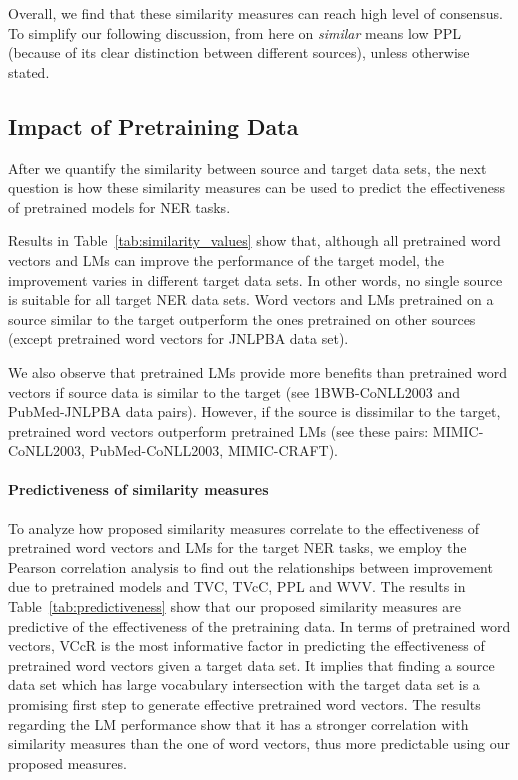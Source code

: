 \documentclass[11pt,a4paper]{article}
\begin{document}
Overall, we find that these similarity measures can reach high level of consensus. 
To simplify our following discussion, from here on {\em similar} means low PPL (because of its clear distinction between different sources), unless otherwise stated.


\subsection{Impact of Pretraining Data}\label{sec-impactpretrainingdata}
After we quantify the similarity between source and target data sets, the next question is how these similarity measures can be used to predict the effectiveness of pretrained models for NER tasks. 

Results in Table~\ref{tab:similarity_values} show that, although all pretrained word vectors and LMs can improve the performance of the target model, the improvement varies in different target data sets. 
In other words, no single source is suitable for all target NER data sets. 
Word vectors and LMs pretrained on a source similar to the target outperform the ones pretrained on other sources (except pretrained word vectors for JNLPBA data set). 

We also observe that pretrained LMs provide more benefits than pretrained word vectors if source data is similar to the target (see 1BWB-CoNLL2003 and PubMed-JNLPBA data pairs).
However, if the source is dissimilar to the target, pretrained word vectors outperform pretrained LMs (see these pairs: MIMIC-CoNLL2003, PubMed-CoNLL2003, MIMIC-CRAFT).

\paragraph{Predictiveness of similarity measures}
To analyze how proposed similarity measures correlate to the effectiveness of pretrained word vectors and LMs for the target NER tasks, we employ the Pearson correlation analysis to find out the relationships between improvement due to pretrained models and TVC, TVcC, PPL and WVV. 
The results in Table~\ref{tab:predictiveness} show that our proposed similarity measures are predictive of the effectiveness of the pretraining data. 
In terms of pretrained word vectors, VCcR is the most informative factor in predicting the effectiveness of pretrained word vectors given a target data set. 
It implies that finding a source data set which has large vocabulary intersection with the target data set is a promising first step to generate effective pretrained word vectors. 
The results regarding the LM performance show that it has a stronger correlation with similarity measures than the one of word vectors, thus more predictable using our proposed measures.
\end{document}
